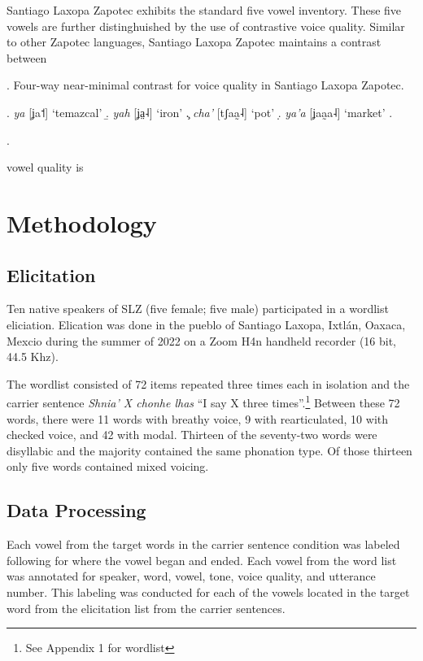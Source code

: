 \documentclass[12pt, letterpaper]{article}
\begin{document}
Santiago Laxopa Zapotec exhibits the standard five vowel inventory. These five vowels are further distinghuished by the use of contrastive voice quality. Similar to other Zapotec languages, Santiago Laxopa Zapotec maintains a contrast between 

\ex. Four-way near-minimal contrast for voice quality in Santiago Laxopa Zapotec.
\begin{multicols}{4}
  \a. \textit{ya} [ʝa˦] ‘temazcal’
  \b. \textit{yah} [ʝa̤˨] ‘iron’
  \c. \textit{cha’} [tʃaa̰˨] ‘pot’
  \d. \textit{ya’a} [ʝaa̰a˨] ‘market’
  \z. 
\end{multicols}
\z. 

vowel quality is 

\section{Methodology} \label{sec:Methods}

\subsection{Elicitation} \label{sec:Elicitation}
Ten native speakers of SLZ (five female; five male) participated in a wordlist eliciation. Elication was done in the pueblo of Santiago Laxopa, Ixtlán, Oaxaca, Mexcio during the summer of 2022 on a Zoom H4n handheld recorder (16 bit, 44.5 Khz). 

The wordlist consisted of 72 items repeated three times each in isolation and the carrier sentence \textit{Shnia' X chonhe lhas} ``I say X three times''.\footnote{See Appendix 1 for wordlist} Between these 72 words, there were 11 words with breathy voice, 9 with rearticulated, 10 with checked voice, and 42 with modal. Thirteen of the seventy-two words were disyllabic and the majority contained the same phonation type. Of those thirteen only five words contained mixed voicing.

\subsection{Data Processing} \label{sec:Processing}

Each vowel from the target words in the carrier sentence condition was labeled following \citet{garellekAcousticDiscriminabilityComplex2020} for where the vowel began and ended. Each vowel from the word list was annotated for speaker, word, vowel, tone, voice quality, and utterance number. This labeling was conducted for each of the vowels located in the target word from the elicitation list from the carrier sentences.
\end{document}
